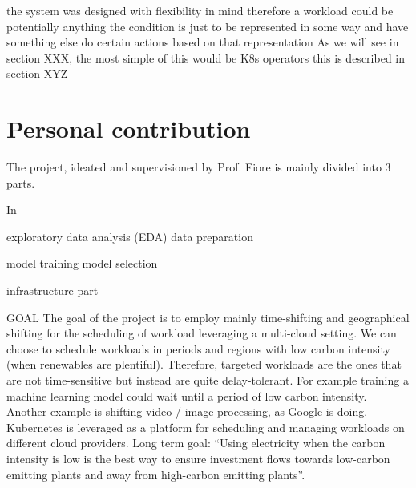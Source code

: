 the system was designed with flexibility in mind therefore a workload could be potentially anything
the condition is just to be represented in some way and have something else do certain actions based on that representation
As we will see in section XXX, the most simple of this would be K8s operators
this is described in section XYZ

\section{Personal contribution}

The project, ideated and supervisioned by Prof. Fiore is mainly divided into 3 parts.

In 

exploratory data analysis (EDA)
data preparation

model training
model selection

infrastructure part


\newpage


GOAL
The goal of the project is to employ mainly time-shifting and geographical shifting for the scheduling of workload leveraging a multi-cloud setting.
We can choose to schedule workloads in periods and regions with low carbon intensity (when renewables are plentiful). 
Therefore, targeted workloads are the ones that are not time-sensitive but instead are quite delay-tolerant. For example training a machine learning model could wait until a period of low carbon intensity. Another example is shifting video / image processing, as Google is doing.
Kubernetes is leveraged as a platform for scheduling and managing workloads on different cloud providers.
Long term goal: “Using electricity when the carbon intensity is low is the best way to ensure investment flows towards low-carbon emitting plants and away from high-carbon emitting plants”.
